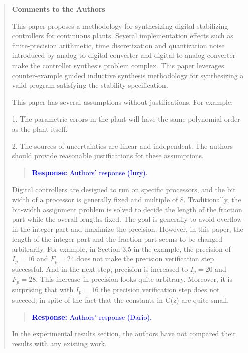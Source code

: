 \documentclass[11pt]{article}
\begin{document}
\begin{quote}

{\bf Comments to the Authors}

This paper proposes a methodology for synthesizing digital stabilizing controllers for continuous plants. Several implementation effects such as finite-precision arithmetic, time discretization and quantization noise introduced by analog to digital converter and digital to analog converter make the controller synthesis problem complex. This paper leverages counter-example guided inductive synthesis methodology for synthesizing a valid program satisfying the stability specification.  

This paper has several assumptions without justifications. For example:

1. The parametric errors in the plant will have the same polynomial order as the plant itself.

2. The sources of uncertainties are linear and independent.
The authors should provide reasonable justifications for these assumptions.

\begin{quote}
\textcolor{blue}{\textbf{Response:} Authors' response (Iury).}
\end{quote}

Digital controllers are designed to run on specific processors, and the bit width of a processor is generally fixed and multiple of 8. Traditionally, the bit-width assignment problem is solved to decide the length of the fraction part while the overall lengths fixed. The goal is generally to avoid overflow in the integer part and maximize the precision. However, in this paper, the length of the integer part and the fraction part seems to be changed arbitrarily. For example, in Section 3.5 in the example, the precision of $I_p = 16$ and $F_p = 24$ does not make the precision verification step successful. And in the next step, precision is increased to $I_p = 20$ and $F_p = 28$. This increase in precision looks quite arbitrary. Moreover, it is surprising that with $I_p = 16$ the precision verification step does not succeed, in spite of the fact that the constants in C(z) are quite small.

\begin{quote}
\textcolor{blue}{\textbf{Response:} Authors' response (Dario).}
\end{quote}

In the experimental results section, the authors have not compared their results with any existing work. 


\end{quote}
\end{document}
